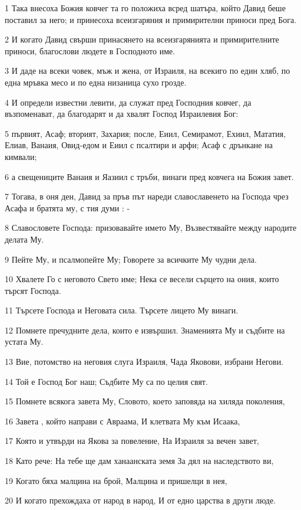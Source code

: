 \par 1 Така внесоха Божия ковчег та го положиха всред шатъра, който Давид беше поставил за него; и принесоха всеизгаряния и примирителни приноси пред Бога.
\par 2 И когато Давид свърши принасянето на всеизгарянията и примирителните приноси, благослови людете в Господното име.
\par 3 И даде на всеки човек, мъж и жена, от Израиля, на всекиго по един хляб, по една мръвка месо и по една низаница сухо грозде.
\par 4 И определи известни левити, да служат пред Господния ковчег, да възпоменават, да благодарят и да хвалят Господ Израилевия Бог:
\par 5 първият, Асаф; вторият, Захария; после, Еиил, Семирамот, Ехиил, Мататия, Елиав, Ванаия, Овид-едом и Еиил с псалтири и арфи; Асаф с дрънкане на кимвали;
\par 6 а свещениците Ванаия и Яазиил с тръби, винаги пред ковчега на Божия завет.
\par 7 Тогава, в оня ден, Давид за пръв път нареди славославенето на Господа чрез Асафа и братята му, с тия думи : -
\par 8 Славословете Господа: призовавайте името Му, Възвестявайте между народите делата Му.
\par 9 Пейте Му, и псалмопейте Му; Говорете за всичките Му чудни дела.
\par 10 Хвалете Го с неговото Свето име; Нека се весели сърцето на ония, които търсят Господа.
\par 11 Търсете Господа и Неговата сила. Търсете лицето Му винаги.
\par 12 Помнете пречудните дела, които е извършил. Знаменията Му и съдбите на устата Му.
\par 13 Вие, потомство на неговия слуга Израиля, Чада Яковови, избрани Негови.
\par 14 Той е Господ Бог наш; Съдбите Му са по целия свят.
\par 15 Помнете всякога завета Му, Словото, което заповяда на хиляда поколения,
\par 16 Завета , който направи с Авраама, И клетвата Му към Исаака,
\par 17 Която и утвърди на Якова за повеление, На Израиля за вечен завет,
\par 18 Като рече: На тебе ще дам ханаанската земя За дял на наследството ви,
\par 19 Когато бяха малцина на брой, Малцина и пришелци в нея,
\par 20 И когато прехождаха от народ в народ, И от едно царства в други люде.

